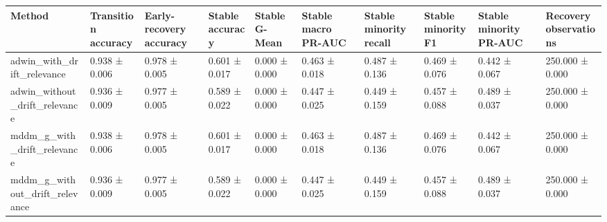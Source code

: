 \begin{tabular}{llllllllll}
\toprule
Method & Transition accuracy & Early-recovery accuracy & Stable accuracy & Stable G-Mean & Stable macro PR-AUC & Stable minority recall & Stable minority F1 & Stable minority PR-AUC & Recovery observations \\
\midrule
adwin\_with\_drift\_relevance & 0.938 ± 0.006 & 0.978 ± 0.005 & 0.601 ± 0.017 & 0.000 ± 0.000 & 0.463 ± 0.018 & 0.487 ± 0.136 & 0.469 ± 0.076 & 0.442 ± 0.067 & 250.000 ± 0.000 \\
adwin\_without\_drift\_relevance & 0.936 ± 0.009 & 0.977 ± 0.005 & 0.589 ± 0.022 & 0.000 ± 0.000 & 0.447 ± 0.025 & 0.449 ± 0.159 & 0.457 ± 0.088 & 0.489 ± 0.037 & 250.000 ± 0.000 \\
mddm\_g\_with\_drift\_relevance & 0.938 ± 0.006 & 0.978 ± 0.005 & 0.601 ± 0.017 & 0.000 ± 0.000 & 0.463 ± 0.018 & 0.487 ± 0.136 & 0.469 ± 0.076 & 0.442 ± 0.067 & 250.000 ± 0.000 \\
mddm\_g\_without\_drift\_relevance & 0.936 ± 0.009 & 0.977 ± 0.005 & 0.589 ± 0.022 & 0.000 ± 0.000 & 0.447 ± 0.025 & 0.449 ± 0.159 & 0.457 ± 0.088 & 0.489 ± 0.037 & 250.000 ± 0.000 \\
\bottomrule
\end{tabular}

